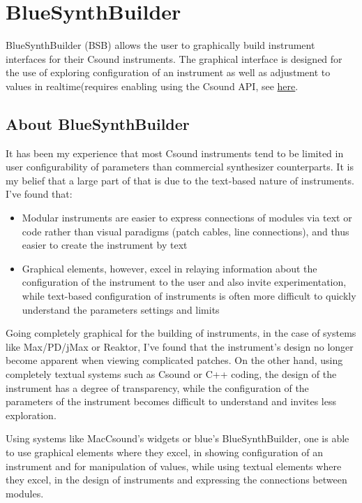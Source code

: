 \section{BlueSynthBuilder}\label{blueSynthBuilder}

BlueSynthBuilder (BSB) allows the user to graphically build instrument
interfaces for their Csound instruments. The graphical interface is
designed for the use of exploring configuration of an instrument as well
as adjustment to values in realtime(requires enabling using the Csound
API, see \protect\hyperlink{csoundAPI}{here}.

\subsection{About BlueSynthBuilder}

It has been my experience that most Csound instruments tend to be
limited in user configurability of parameters than commercial
synthesizer counterparts. It is my belief that a large part of that is
due to the text-based nature of instruments. I've found that:

\begin{itemize}
\item
  Modular instruments are easier to express connections of modules via
  text or code rather than visual paradigms (patch cables, line
  connections), and thus easier to create the instrument by text
\item
  Graphical elements, however, excel in relaying information about the
  configuration of the instrument to the user and also invite
  experimentation, while text-based configuration of instruments is
  often more difficult to quickly understand the parameters settings and
  limits
\end{itemize}

Going completely graphical for the building of instruments, in the case
of systems like Max/PD/jMax or Reaktor, I've found that the instrument's
design no longer become apparent when viewing complicated patches. On
the other hand, using completely textual systems such as Csound or C++
coding, the design of the instrument has a degree of transparency, while
the configuration of the parameters of the instrument becomes difficult
to understand and invites less exploration.

Using systems like MacCsound's widgets or blue's BlueSynthBuilder, one
is able to use graphical elements where they excel, in showing
configuration of an instrument and for manipulation of values, while
using textual elements where they excel, in the design of instruments
and expressing the connections between modules.

